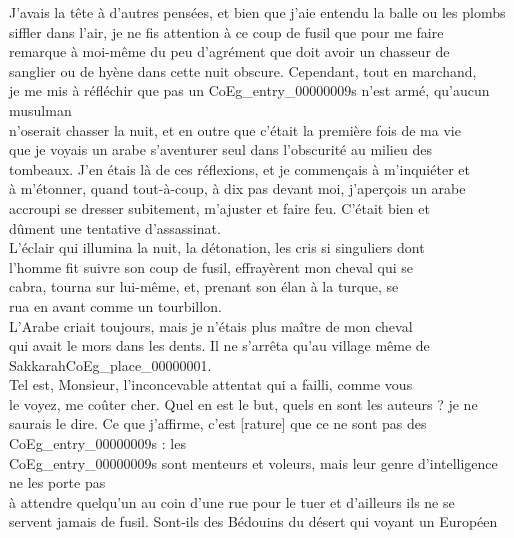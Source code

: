 \documentclass{book}
\begin{document}
J’avais la tête à d’autres pensées, et bien que j’aie entendu la balle ou les plombs\\
siffler dans l’air, je ne fis attention à ce coup de fusil que pour me faire\\
remarque à moi-même du peu d’agrément que doit avoir un chasseur de\\
sanglier ou de hyène dans cette nuit obscure. Cependant, tout en marchand,\\
je me mis à réfléchir que pas un \glspl{CoEg_entry_00000009} n’est armé, qu’aucun musulman\\
n’oserait chasser la nuit, et en outre que c’était la première fois de ma vie\\
que je voyais un arabe s’aventurer seul dans l’obscurité au milieu des\\
tombeaux. J’en étais là de ces réflexions, et je commençais à m’inquiéter et\\
à m’étonner, quand tout-à-coup, à dix pas devant moi, j’aperçois un arabe\\
accroupi se dresser subitement, m’ajuster et faire feu. C’était bien et\\
dûment une tentative d’assassinat.\\
\indent L’éclair qui illumina la nuit, la détonation, les cris si singuliers dont\\
l’homme fit suivre son coup de fusil, effrayèrent mon cheval qui se\\
cabra, tourna sur lui-même, et, prenant son élan à la turque, se\\
rua en avant comme un tourbillon.\\
\indent L’Arabe criait toujours, mais je n’étais plus maître de mon cheval\\
qui avait le mors dans les dents. Il ne s’arrêta qu’au village même de Sakkarah\gls{CoEg_place_00000001}.\\
\indent Tel est, Monsieur, l’inconcevable attentat qui a failli, comme vous\\
le voyez, me coûter cher. Quel en est le but, quels en sont les auteurs ? je ne\\
saurais le dire. Ce que j’affirme, c’est [rature] que ce ne sont pas des \glspl{CoEg_entry_00000009} : les\\
\glspl{CoEg_entry_00000009} sont menteurs et voleurs, mais leur genre d’intelligence ne les porte pas\\
à attendre quelqu’un au coin d’une rue pour le tuer et d’ailleurs ils ne se\\
servent jamais de fusil. Sont-ils des Bédouins du désert qui voyant un Européen\\
\end{document}
